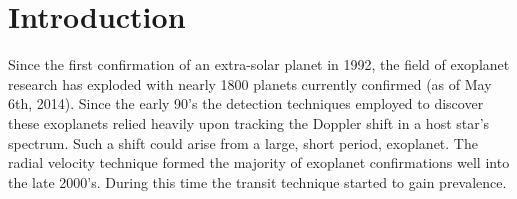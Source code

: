 \documentclass[
10pt, %
a4paper, %
oneside, %
headinclude,footinclude, %
BCOR5mm, %
]{scrartcl}
\begin{document}



\newpage %


\section{Introduction}

Since the first confirmation of an extra-solar planet in 1992\cite{Wolszczan:1992}, the field of exoplanet research has exploded with nearly 1800 planets currently confirmed (as of May 6th, 2014\cite{ExoData:nasa}). Since the early 90's the detection techniques employed to discover these exoplanets relied heavily upon tracking the Doppler shift in a host star's spectrum. Such a shift could arise from a large, short period, exoplanet. The radial velocity technique formed the majority of exoplanet confirmations well into the late 2000's\cite{RV1}. During this time the transit technique started to gain prevalence. 
\end{document}
